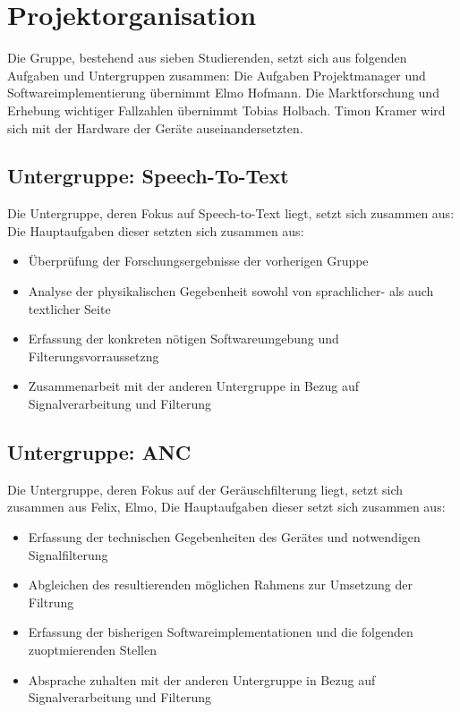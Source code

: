 \documentclass{article}
\begin{document}
\pagebreak

\section{Projektorganisation}
Die Gruppe, bestehend aus sieben Studierenden, setzt sich aus folgenden Aufgaben und Untergruppen zusammen:
Die Aufgaben Projektmanager und Softwareimplementierung übernimmt Elmo Hofmann. Die Marktforschung und Erhebung wichtiger Fallzahlen übernimmt Tobias Holbach. Timon Kramer wird sich mit der Hardware der Geräte auseinandersetzten.


\subsection{Untergruppe: Speech-To-Text}
Die Untergruppe, deren Fokus auf Speech-to-Text liegt, setzt sich zusammen aus: \\
Die Hauptaufgaben dieser setzten sich zusammen aus:
\begin{itemize}
    \item Überprüfung der Forschungsergebnisse der vorherigen Gruppe
    \item Analyse der physikalischen Gegebenheit sowohl von sprachlicher- als auch textlicher Seite
    \item Erfassung der konkreten nötigen Softwareumgebung und Filterungsvorraussetzng 
    \item Zusammenarbeit mit der anderen Untergruppe in Bezug auf Signalverarbeitung und Filterung 
\end{itemize}

\subsection{Untergruppe: ANC}
Die Untergruppe, deren Fokus auf der Geräuschfilterung liegt, setzt sich zusammen aus Felix, Elmo, 
Die Hauptaufgaben dieser setzt sich zusammen aus:
\begin{itemize}
    \item Erfassung der technischen Gegebenheiten des Gerätes und notwendigen Signalfilterung
    \item Abgleichen des resultierenden möglichen Rahmens zur Umsetzung der Filtrung
    \item Erfassung der bisherigen Softwareimplementationen und die folgenden zuoptmierenden Stellen
    \item Absprache zuhalten mit der anderen Untergruppe in Bezug auf Signalverarbeitung und Filterung
\end{itemize}
\end{document}

